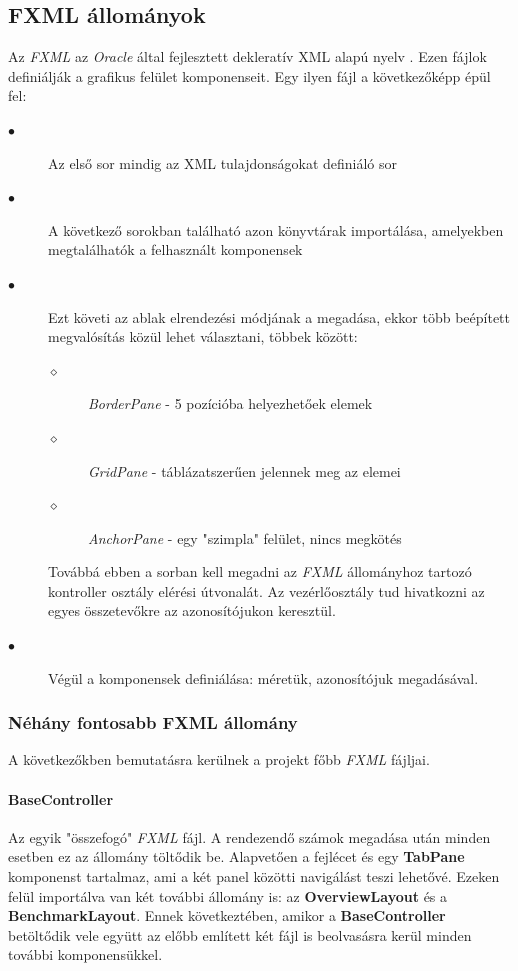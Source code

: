 \documentclass{elteikthesis}
\begin{document}
\subsection{FXML állományok}
Az \emph{FXML} az \emph{Oracle} által fejlesztett dekleratív XML alapú nyelv \cite{FXML}. Ezen fájlok definiálják a grafikus felület komponenseit. Egy ilyen fájl a következőképp épül fel:
\begin{description}
	\item[$\bullet$] Az első sor mindig az XML tulajdonságokat definiáló sor
	\item[$\bullet$] A következő sorokban található azon könyvtárak importálása, amelyekben megtalálhatók a felhasznált komponensek
	\item[$\bullet$] Ezt követi az ablak elrendezési módjának a megadása, ekkor több beépített megvalósítás közül lehet választani, többek között:
		\begin{description}
		\item[$\diamond$] \emph{BorderPane} - 5 pozícióba helyezhetőek elemek
		\item[$\diamond$] \emph{GridPane} - táblázatszerűen jelennek meg az elemei
		\item[$\diamond$] \emph{AnchorPane} - egy "szimpla" felület, nincs megkötés	
		\end{description}
	Továbbá ebben a sorban kell megadni az \emph{FXML} állományhoz tartozó kontroller osztály elérési útvonalát. Az vezérlőosztály tud hivatkozni az egyes összetevőkre az azonosítójukon keresztül.
	\item[$\bullet$] Végül a komponensek definiálása: méretük, azonosítójuk megadásával.
\end{description}
\subsubsection{Néhány fontosabb FXML állomány}
A következőkben bemutatásra kerülnek a projekt főbb \emph{FXML} fájljai.
\paragraph{BaseController}
Az egyik "összefogó" \emph{FXML} fájl. A rendezendő számok megadása után minden esetben ez az állomány töltődik be. Alapvetően a fejlécet és egy \textbf{TabPane} komponenst tartalmaz, ami a két panel közötti navigálást teszi lehetővé. Ezeken felül importálva van két további állomány is: az \textbf{OverviewLayout} és a \textbf{BenchmarkLayout}. Ennek következtében, amikor a \textbf{BaseController} betöltődik vele együtt az előbb említett két fájl is beolvasásra kerül minden további komponensükkel.
\end{document}
